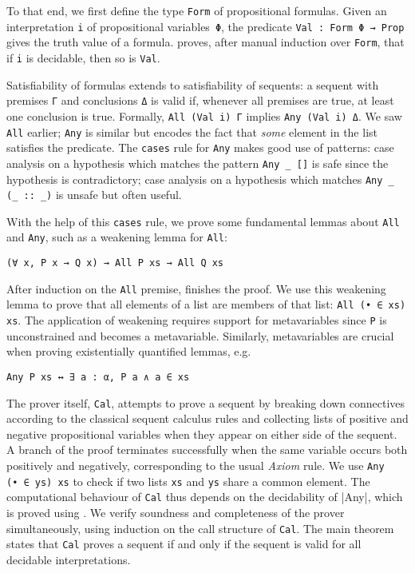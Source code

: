 To that end, we first define the type \texttt{Form} of propositional formulas.
Given an interpretation \texttt{i} of propositional variables~\texttt{Φ}, the
predicate \texttt{Val~: Form~Φ~→ Prop} gives the truth value of a formula.
\Aesop{} proves, after manual induction over \texttt{Form}, that if \texttt{i}
is decidable, then so is \texttt{Val}.

Satisfiability of formulas extends to satisfiability of sequents: a sequent with
premises \texttt{Γ} and conclusions \texttt{Δ} is valid if, whenever all
premises are true, at least one conclusion is true. Formally,
\texttt{All~(Val~i)~Γ} implies \texttt{Any~(Val~i)~Δ}. We saw \texttt{All}
earlier; \texttt{Any} is similar but encodes the fact that \emph{some} element
in the list satisfies the predicate. The \texttt{cases} rule for \texttt{Any}
makes good use of patterns: case analysis on a hypothesis which matches the
pattern \verb|Any _ []| is safe since the hypothesis is contradictory; case
analysis on a hypothesis which matches \verb|Any _ (_ :: _)| is unsafe but often
useful.

With the help of this \texttt{cases} rule, we prove some fundamental lemmas
about \texttt{All} and \texttt{Any}, such as a weakening lemma for \texttt{All}:
\begin{lstlisting}
(∀ x, P x → Q x) → All P xs → All Q xs
\end{lstlisting}
After induction on the \texttt{All} premise, \Aesop{} finishes the proof. We use
this weakening lemma to prove that all elements of a list are members of that
list: \texttt{All (•~∈~xs) xs}. The application of weakening requires support
for metavariables since \texttt{P} is unconstrained and becomes a metavariable.
Similarly, metavariables are crucial when proving existentially quantified
lemmas, e.g.
\begin{lstlisting}
Any P xs ↔ ∃ a : α, P a ∧ a ∈ xs
\end{lstlisting}

The prover itself, \texttt{Cal}, attempts to prove a sequent by breaking down
connectives according to the classical sequent calculus rules and collecting lists
of positive and negative propositional variables when they appear on either side
of the sequent. A branch of the proof terminates successfully when the same
variable occurs both positively and negatively, corresponding to the usual
\emph{Axiom} rule. We use \texttt{Any (•~∈~ys) xs} to check if two lists
\texttt{xs} and \texttt{ys} share a common element. The computational behaviour
of \texttt{Cal} thus depends on the decidability of |Any|, which is proved
using \Aesop. We verify soundness and completeness of the prover simultaneously,
using induction on the call structure of \texttt{Cal}. The main theorem states
that \texttt{Cal} proves a sequent if and only if the sequent is valid for all
decidable interpretations.

